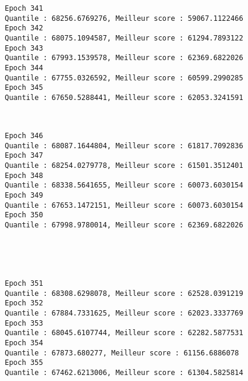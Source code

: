 \documentclass[11pt]{article}
\begin{document}
    \begin{Verbatim}[commandchars=\\\{\}]
Epoch 341
Quantile : 68256.6769276, Meilleur score : 59067.1122466
Epoch 342
Quantile : 68075.1094587, Meilleur score : 61294.7893122
Epoch 343
Quantile : 67993.1539578, Meilleur score : 62369.6822026
Epoch 344
Quantile : 67755.0326592, Meilleur score : 60599.2990285
Epoch 345
Quantile : 67650.5288441, Meilleur score : 62053.3241591

    \end{Verbatim}

    \begin{center}
    \end{center}
    { \hspace*{\fill} \\}
    
    \begin{Verbatim}[commandchars=\\\{\}]
Epoch 346
Quantile : 68087.1644804, Meilleur score : 61817.7092836
Epoch 347
Quantile : 68254.0279778, Meilleur score : 61501.3512401
Epoch 348
Quantile : 68338.5641655, Meilleur score : 60073.6030154
Epoch 349
Quantile : 67653.1472151, Meilleur score : 60073.6030154
Epoch 350
Quantile : 67998.9780014, Meilleur score : 62369.6822026

    \end{Verbatim}

    \begin{center}
    \end{center}
    { \hspace*{\fill} \\}
    
    \begin{center}
    \end{center}
    { \hspace*{\fill} \\}
    
    \begin{Verbatim}[commandchars=\\\{\}]
Epoch 351
Quantile : 68308.6298078, Meilleur score : 62528.0391219
Epoch 352
Quantile : 67884.7331625, Meilleur score : 62023.3337769
Epoch 353
Quantile : 68045.6107744, Meilleur score : 62282.5877531
Epoch 354
Quantile : 67873.680277, Meilleur score : 61156.6886078
Epoch 355
Quantile : 67462.6213006, Meilleur score : 61304.5825814

    \end{Verbatim}
\end{document}

